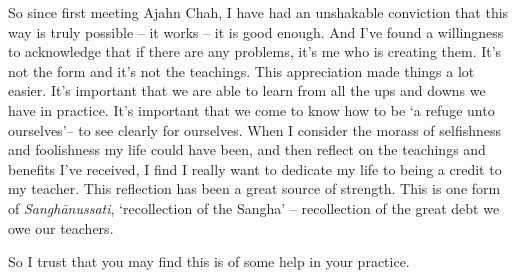 So since first meeting Ajahn Chah, I have had an unshakable conviction
that this way is truly possible -- it works -- it is good enough. And
I've found a willingness to acknowledge that if there are any problems, 
it's me who is creating them. It's not the form and it's not the
teachings. This appreciation made things a lot easier. It's important
that we are able to learn from all the ups and downs we have in
practice. It's important that we come to know how to be `a refuge unto
ourselves'-- to see clearly for ourselves. When I consider the morass of
selfishness and foolishness my life could have been, and then reflect on
the teachings and benefits I've received, I find I really want to
dedicate my life to being a credit to my teacher. This reflection has
been a great source of strength. This is one form of
\emph{Sanghānussati}, `recollection of the Sangha' -- recollection of
the great debt we owe our teachers. 

So I trust that you may find this is of some help in your practice.

